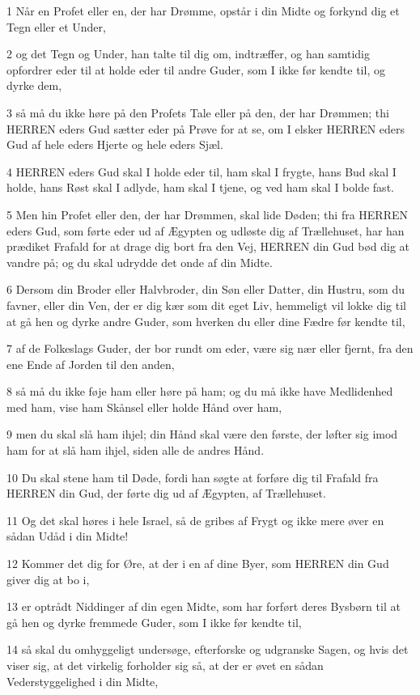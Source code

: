 \par 1 Når en Profet eller en, der har Drømme, opstår i din Midte og forkynd dig et Tegn eller et Under,
\par 2 og det Tegn og Under, han talte til dig om, indtræffer, og han samtidig opfordrer eder til at holde eder til andre Guder, som I ikke før kendte til, og dyrke dem,
\par 3 så må du ikke høre på den Profets Tale eller på den, der har Drømmen; thi HERREN eders Gud sætter eder på Prøve for at se, om I elsker HERREN eders Gud af hele eders Hjerte og hele eders Sjæl.
\par 4 HERREN eders Gud skal I holde eder til, ham skal I frygte, hans Bud skal I holde, hans Røst skal I adlyde, ham skal I tjene, og ved ham skal I bolde fast.
\par 5 Men hin Profet eller den, der har Drømmen, skal lide Døden; thi fra HERREN eders Gud, som førte eder ud af Ægypten og udløste dig af Trællehuset, har han prædiket Frafald for at drage dig bort fra den Vej, HERREN din Gud bød dig at vandre på; og du skal udrydde det onde af din Midte.
\par 6 Dersom din Broder eller Halvbroder, din Søn eller Datter, din Hustru, som du favner, eller din Ven, der er dig kær som dit eget Liv, hemmeligt vil lokke dig til at gå hen og dyrke andre Guder, som hverken du eller dine Fædre før kendte til,
\par 7 af de Folkeslags Guder, der bor rundt om eder, være sig nær eller fjernt, fra den ene Ende af Jorden til den anden,
\par 8 så må du ikke føje ham eller høre på ham; og du må ikke have Medlidenhed med ham, vise ham Skånsel eller holde Hånd over ham,
\par 9 men du skal slå ham ihjel; din Hånd skal være den første, der løfter sig imod ham for at slå ham ihjel, siden alle de andres Hånd.
\par 10 Du skal stene ham til Døde, fordi han søgte at forføre dig til Frafald fra HERREN din Gud, der førte dig ud af Ægypten, af Trællehuset.
\par 11 Og det skal høres i hele Israel, så de gribes af Frygt og ikke mere øver en sådan Udåd i din Midte!
\par 12 Kommer det dig for Øre, at der i en af dine Byer, som HERREN din Gud giver dig at bo i,
\par 13 er optrådt Niddinger af din egen Midte, som har forført deres Bysbørn til at gå hen og dyrke fremmede Guder, som I ikke før kendte til,
\par 14 så skal du omhyggeligt undersøge, efterforske og udgranske Sagen, og hvis det viser sig, at det virkelig forholder sig så, at der er øvet en sådan Vederstyggelighed i din Midte,
